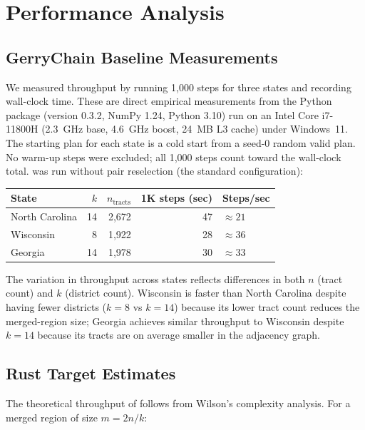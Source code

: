 \section{Performance Analysis}
\label{sec:performance}

\subsection{GerryChain Baseline Measurements}

We measured \gc{} throughput by running 1{,}000 \recom{} steps for
three states and recording wall-clock time.
These are direct empirical measurements from the \gc{} Python package
(version 0.3.2, NumPy 1.24, Python 3.10) run on an Intel Core i7-11800H
(2.3~GHz base, 4.6~GHz boost, 24~MB L3 cache) under Windows~11.
The starting plan for each state is a cold start from a seed-0 random
valid plan.
No warm-up steps were excluded; all 1{,}000 steps count toward the
wall-clock total.
\gc{} was run without pair reselection (the standard configuration):

\begin{center}
\begin{tabular}{lrrrl}
\toprule
State & $k$ & $n_{\text{tracts}}$ & 1K steps (sec) & Steps/sec \\
\midrule
North Carolina & 14 & 2{,}672 & 47 & $\approx 21$ \\
Wisconsin      &  8 & 1{,}922 & 28 & $\approx 36$ \\
Georgia        & 14 & 1{,}978 & 30 & $\approx 33$ \\
\bottomrule
\end{tabular}
\end{center}

The variation in throughput across states reflects differences in both
$n$ (tract count) and $k$ (district count).
Wisconsin is faster than North Carolina despite having fewer districts
($k=8$ vs $k=14$) because its lower tract count reduces the merged-region
size; Georgia achieves similar throughput to Wisconsin despite $k=14$
because its tracts are on average smaller in the adjacency graph.

\subsection{Rust Target Estimates}

The theoretical throughput of \re{} follows from Wilson's complexity
analysis.
For a merged region of size $m = 2n/k$:

